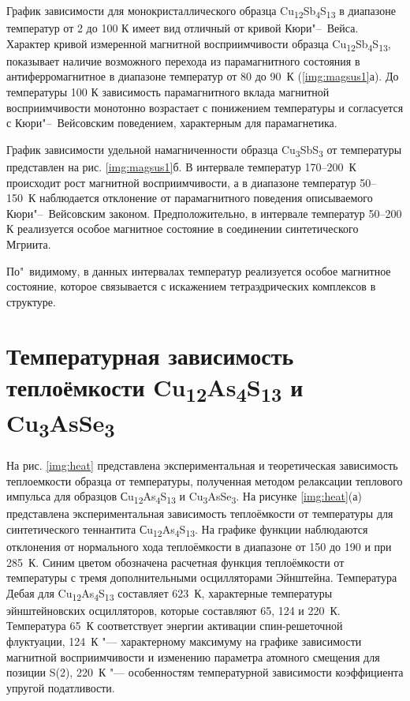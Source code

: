 График зависимости для монокристаллического образца Cu\textsubscript{12}Sb\textsubscript{4}S\textsubscript{13} в диапазоне температур от 2 до 100 К имеет вид отличный от кривой Кюри"--~Вейса.
 Характер кривой измеренной магнитной восприимчивости образца  Cu\textsubscript{12}Sb\textsubscript{4}S\textsubscript{13}, показывает наличие возможного перехода из парамагнитного состояния в антиферромагнитное в диапазоне температур от 80 до 90~К (\ref{img:magsus1}а).
До температуры 100 К зависимость парамагнитного вклада магнитной восприимчивости монотонно возрастает с понижением температуры и согласуется с Кюри"--~Вейсовским поведением, характерным для парамагнетика.

График зависимости удельной намагниченности образца Cu\textsubscript{3}SbS\textsubscript{3} от температуры представлен на рис. \ref{img:magsus1}б.
В интервале температур 170--200~К происходит рост магнитной восприимчивости, а в диапазоне температур 50--150~К наблюдается отклонение от парамагнитного поведения описываемого Кюри"--~Вейсовским законом. 
Предположительно, в интервале температур 50--200 К реализуется особое магнитное состояние в соединении синтетического Мгриита.


По"~видимому, в данных интервалах температур реализуется особое магнитное состояние, которое связывается с искажением тетраэдрических комплексов в структуре.

\newpage


\section{Температурная зависимость теплоёмкости Cu\textsubscript{12}As\textsubscript{4}S\textsubscript{13} и Cu\textsubscript{3}AsSe\textsubscript{3}} \label{sect3_4}
На рис. \ref{img:heat} представлена экспериментальная и теоретическая зависимость теплоемкости  образца от температуры, полученная методом релаксации теплового импульса для образцов Сu\textsubscript{12}As\textsubscript{4}S\textsubscript{13} и Cu\textsubscript{3}AsSe\textsubscript{3}. 
На рисунке \ref{img:heat}(а) представлена экспериментальная зависимость теплоёмкости от температуры для синтетического теннантита Сu\textsubscript{12}As\textsubscript{4}S\textsubscript{13}. На графике функции наблюдаются отклонения от нормального хода теплоёмкости в диапазоне от 150 до 190 и при 285~К. Синим цветом обозначена расчетная функция теплоёмкости от температуры с тремя дополнительными осцилляторами Эйнштейна. Температура Дебая для Cu\textsubscript{12}As\textsubscript{4}S\textsubscript{13} составляет 623~К, характерные температуры эйнштейновских осцилляторов, которые составляют 65, 124 и 220~К. Температура 65~К соответствует энергии активации спин-решеточной флуктуации\cite{Gainov2008,Gainov_2006}, 124~К "--- характерному максимуму на графике зависимости магнитной восприимчивости и изменению параметра атомного смещения для позиции S(2), 220~К "--- особенностям температурной зависимости коэффициента упругой податливости\cite{bab_81}.

